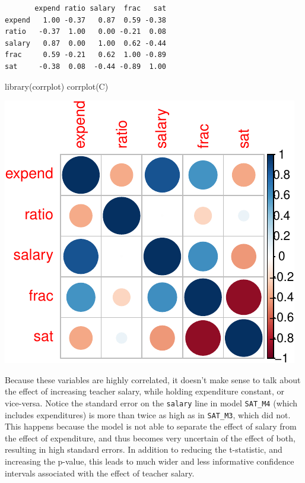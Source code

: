 \documentclass[
  letterpaper,
  DIV=11,
  numbers=noendperiod]{scrreprt}
\newenvironment{Shaded}{\begin{snugshade}}{\end{snugshade}}
\newcommand{\FunctionTok}[1]{\textcolor[rgb]{0.28,0.35,0.67}{#1}}
\newcommand{\NormalTok}[1]{\textcolor[rgb]{0.00,0.23,0.31}{#1}}
\begin{document}
\begin{verbatim}
       expend ratio salary  frac   sat
expend   1.00 -0.37   0.87  0.59 -0.38
ratio   -0.37  1.00   0.00 -0.21  0.08
salary   0.87  0.00   1.00  0.62 -0.44
frac     0.59 -0.21   0.62  1.00 -0.89
sat     -0.38  0.08  -0.44 -0.89  1.00
\end{verbatim}

\begin{Shaded}
\begin{Highlighting}[]
\FunctionTok{library}\NormalTok{(corrplot)}
\FunctionTok{corrplot}\NormalTok{(C)}
\end{Highlighting}
\end{Shaded}

\includegraphics{Ch5_files/figure-pdf/unnamed-chunk-40-1.pdf}

Because these variables are highly correlated, it doesn't make sense to
talk about the effect of increasing teacher salary, while holding
expenditure constant, or vice-versa. Notice the standard error on the
\texttt{salary} line in model \texttt{SAT\_M4} (which includes
expenditures) is more than twice as high as in \texttt{SAT\_M3}, which
did not. This happens because the model is not able to separate the
effect of salary from the effect of expenditure, and thus becomes very
uncertain of the effect of both, resulting in high standard errors. In
addition to reducing the t-statistic, and increasing the p-value, this
leads to much wider and less informative confidence intervals associated
with the effect of teacher salary.
\end{document}
